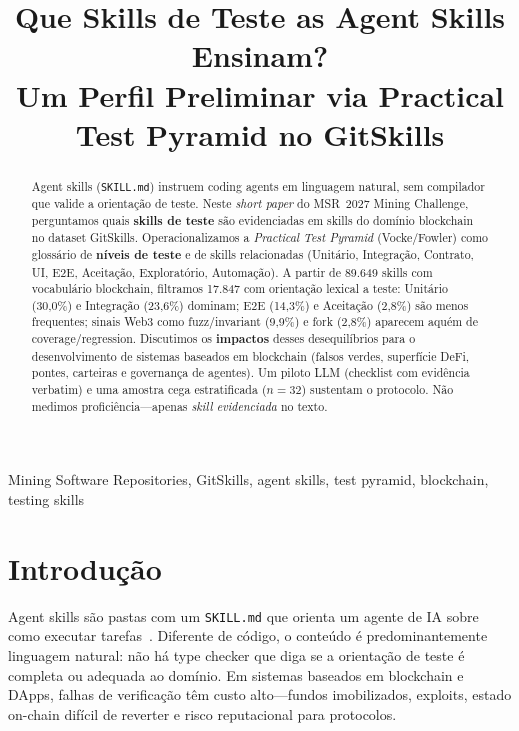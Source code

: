 \documentclass[10pt,conference]{IEEEtran}
\begin{document}
\title{Que Skills de Teste as Agent Skills Ensinam?\\
Um Perfil Preliminar via Practical Test Pyramid no GitSkills}

\author{
}

\maketitle

\begin{abstract}
Agent skills (\texttt{SKILL.md}) instruem coding agents em linguagem natural, sem compilador que valide a orientação de teste.
Neste \emph{short paper} do MSR~2027 Mining Challenge, perguntamos quais \textbf{skills de teste} são evidenciadas em skills do domínio blockchain no dataset GitSkills.
Operacionalizamos a \emph{Practical Test Pyramid} (Vocke/Fowler) como glossário de \textbf{níveis de teste} e de skills relacionadas (Unitário, Integração, Contrato, UI, E2E, Aceitação, Exploratório, Automação).
A partir de 89.649 skills com vocabulário blockchain, filtramos 17.847 com orientação lexical a teste: Unitário (30,0\%) e Integração (23,6\%) dominam; E2E (14,3\%) e Aceitação (2,8\%) são menos frequentes; sinais Web3 como fuzz/invariant (9,9\%) e fork (2,8\%) aparecem aquém de coverage/regression.
Discutimos os \textbf{impactos} desses desequilíbrios para o desenvolvimento de sistemas baseados em blockchain (falsos verdes, superfície DeFi, pontes, carteiras e governança de agentes).
Um piloto LLM (checklist com evidência verbatim) e uma amostra cega estratificada ($n{=}32$) sustentam o protocolo.
Não medimos proficiência---apenas \emph{skill evidenciada} no texto.
\end{abstract}

\begin{IEEEkeywords}
Mining Software Repositories, GitSkills, agent skills, test pyramid, blockchain, testing skills
\end{IEEEkeywords}

\section{Introdução}

Agent skills são pastas com um \texttt{SKILL.md} que orienta um agente de IA sobre como executar tarefas~\cite{gitskills2027}.
Diferente de código, o conteúdo é predominantemente linguagem natural: não há type checker que diga se a orientação de teste é completa ou adequada ao domínio.
Em sistemas baseados em blockchain e DApps, falhas de verificação têm custo alto---fundos imobilizados, exploits, estado on-chain difícil de reverter e risco reputacional para protocolos.
\end{document}

